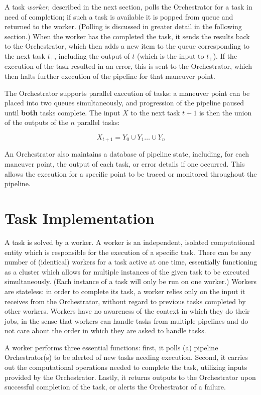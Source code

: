 A task \textit{worker}, described in the next section, polls the Orchestrator for a task in need of completion; if such a task is available it is popped from queue and returned to the worker. (Polling is discussed in greater detail in the following section.) When the worker has the completed the task, it sends the results back to the Orchestrator, which then adds a new item to the queue corresponding to the next task $t_+$, including the output of $t$ (which is the input to $t_+$). If the execution of the task resulted in an error, this is sent to the Orchestrator, which then halts further execution of the pipeline for that maneuver point.

The Orchestrator supports parallel execution of tasks: a maneuver point can be placed into two queues simultaneously, and progression of the pipeline paused until \textbf{both} tasks complete. The input $X$ to the next task $t+1$ is then the union of the outputs of the $n$ parallel tasks:

\begin{equation}\label{eq:paraOrch}
    X_{t+1} = Y_0 \cup Y_1 \dots \cup Y_n
\end{equation}

An Orchestrator also maintains a database of pipeline state, including, for each maneuver point, the output of each task, or error details if one occurred. This allows the execution for a specific point to be traced or monitored throughout the pipeline.

\section{Task Implementation}\label{sec:arch:pipeline_imp}
A task is solved by a worker. A worker is an independent, isolated computational entity which is responsible for the execution of a specific task. There can be any number of (identical) workers for a task active at one time, essentially functioning as a cluster which allows for multiple instances of the given task to be executed simultaneously. (Each instance of a task will only be run on one worker.)  Workers are stateless: in order to complete its task, a worker relies only on the input it receives from the Orchestrator, without regard to previous tasks completed by other workers. Workers have no awareness of the context in which they do their jobs, in the sense that workers can handle tasks from multiple pipelines and do not care about the order in which they are asked to handle tasks. 

A worker performs three essential functions: first, it polls (a) pipeline Orchestrator(s) to be alerted of new tasks needing execution. Second, it carries out the computational operations needed to complete the task, utilizing inputs provided by the Orchestrator. Lastly, it returns outputs to the Orchestrator upon successful completion of the task, or alerts the Orchestrator of a failure. 
 
